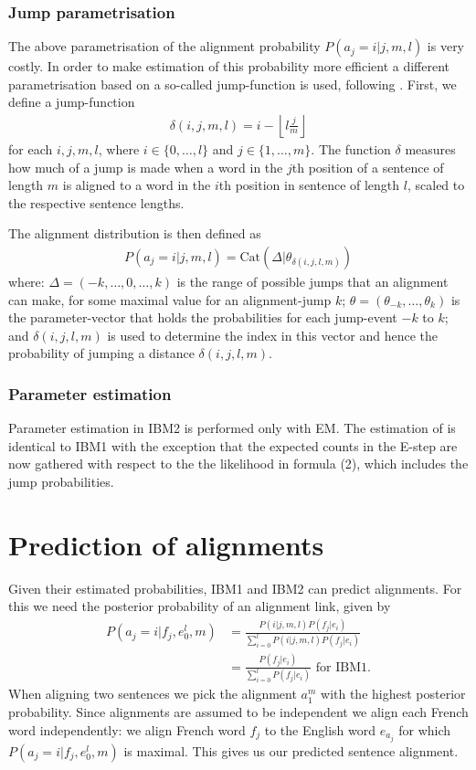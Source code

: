 \documentclass[11pt,a4paper]{article}
\begin{document}
\subsubsection{Jump parametrisation}

The above parametrisation of the alignment probability $P(a_j=i|j, m, l)$ is very costly. In order to make estimation of this probability more efficient a different parametrisation based on a so-called jump-function is used, following \cite{Vogel:1996}. First, we define a jump-function
\begin{align*}
    \delta(i,j,m,l) = i - \left \lfloor{l\frac{j}{m}}\right \rfloor 
\end{align*}
for each $i,j,m,l$, where $i\in\{0,\dots,l\}$ and $j \in \{1,\dots,m\}$. The function $\delta$ measures how much of a jump is made when a word in the $j$th position of a sentence of length $m$ is aligned to a word in the $i$th position in sentence of length $l$, scaled to the respective sentence lengths.

The alignment distribution is then defined as
\begin{align*}
    P(a_j=i|j, m, l) = \text{Cat}(\Delta |\theta_{\delta(i,j,l,m)})
\end{align*}
where: $\Delta = (-k,\dots,0,\dots,k)$ is the range of possible jumps that an alignment can make, for some maximal value for an alignment-jump $k$; $\theta = (\theta_{-k},\dots,\theta_{k})$ is the parameter-vector that holds the probabilities for each jump-event $-k$ to $k$; and $\delta(i,j,l,m)$ is used to determine the index in this vector and hence the probability of jumping a distance $\delta(i,j,l,m)$.

\subsubsection{Parameter estimation}

Parameter estimation in IBM2 is performed only with EM. The estimation of is identical to IBM1 with the exception that the expected counts in the E-step are now gathered with respect to the the likelihood in formula (2), which includes the jump probabilities. 

\section{Prediction of alignments}
Given their estimated probabilities, IBM1 and IBM2 can predict alignments. For this we need the posterior probability of an alignment link, given by
\begin{align*}
    P(a_j = i | f_j, e_0^l, m) &= \frac{P(i|j,m,l)P(f_j|e_i)}{\sum_{i=0}^l P(i|j,m,l)P(f_j|e_i)} \\
    &= \frac{P(f_j|e_i)}{\sum_{i=0}^l P(f_j|e_i)} \text{   for IBM1.}
\end{align*}
When aligning two sentences we pick the alignment $a_1^m$ with the highest posterior probability. Since alignments are assumed to be independent we align each French word independently: we align French word $f_j$ to the English word $e_{a_j}$ for which $P(a_j = i | f_j, e_0^l, m)$ is maximal. This gives us our predicted sentence alignment.
\end{document}

